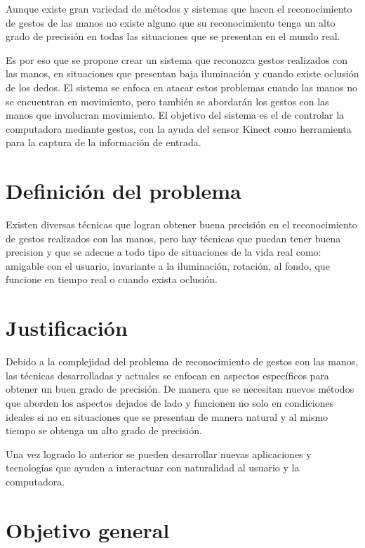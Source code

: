 Aunque existe gran variedad de métodos y sistemas que hacen el reconocimiento de gestos de las manos no existe alguno que su reconocimiento tenga un alto grado de precisión en todas las situaciones que se presentan en el mundo real.  

Es por eso que se propone crear un sistema que reconozca gestos realizados con las manos, en situaciones que presentan baja iluminación y cuando existe oclusión de los dedos. 
El sistema se enfoca en atacar estos problemas cuando las manos no se encuentran en movimiento, pero también se abordar\'an los gestos con las manos que involucran movimiento. El objetivo del sistema es el de controlar la computadora mediante gestos, con la ayuda del sensor Kinect como herramienta para la captura de la información de entrada. 
  


\section{Definici\'on del problema}\label{sec:DefinicionProblema}

Existen diversas técnicas que logran obtener buena precisión en el reconocimiento de gestos realizados con las manos, pero hay técnicas que puedan tener buena precision y que se adecue a todo tipo de situaciones de la vida real como: amigable con el usuario, invariante a la iluminación, rotación, al fondo, que funcione en tiempo real o cuando exista oclusión.



\section{Justificaci\'on}\label{sec:Just}

Debido a la complejidad del problema de reconocimiento de gestos con las manos, las técnicas desarrolladas y actuales se enfocan en aspectos específicos para obtener un buen grado de precisión. De manera que se necesitan nuevos métodos que aborden los aspectos dejados de lado y funcionen no solo en condiciones ideales si no en situaciones que se presentan de manera natural y al mismo tiempo se obtenga un alto grado de precisión.  

Una vez logrado lo anterior se pueden desarrollar nuevas aplicaciones y tecnologías que ayuden a interactuar con naturalidad al usuario y la computadora.



\section{Objetivo general}\label{sec:ObjetivoGeneral}
 
